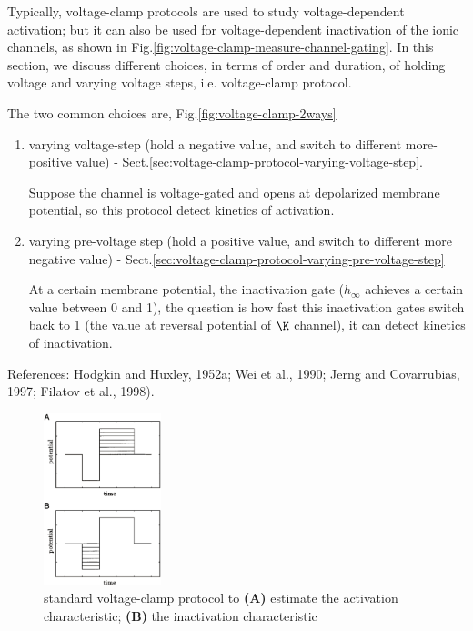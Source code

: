 Typically, voltage-clamp protocols are used to study voltage-dependent
activation; but it can also be used  for voltage-dependent inactivation of the
ionic channels, as shown in Fig.\ref{fig:voltage-clamp-measure-channel-gating}.
In this section, we discuss different choices, in terms of order and duration,
of holding voltage and varying voltage steps, i.e. voltage-clamp protocol.

The two common choices are, Fig.\ref{fig:voltage-clamp-2ways}
\begin{enumerate}
  \item varying voltage-step  (hold a negative value, and switch to different
  more-positive value) -
  Sect.\ref{sec:voltage-clamp-protocol-varying-voltage-step}.

Suppose the channel is voltage-gated and opens at depolarized membrane
potential, so this protocol  detect kinetics of activation.

  \item varying pre-voltage step (hold a positive value, and switch to
  different more negative value) - Sect.\ref{sec:voltage-clamp-protocol-varying-pre-voltage-step}

At a certain membrane potential, the inactivation gate ($h_\infty$ achieves a
certain value between 0 and 1), the question is how fast this inactivation gates
switch back to 1 (the value at reversal potential of $\K$ channel), it can
detect kinetics of inactivation.
\end{enumerate}
References: Hodgkin and Huxley, 1952a; Wei et al., 1990; Jerng and Covarrubias,
1997; Filatov et al., 1998).

\begin{figure}[htb]
    \centerline{\includegraphics[height=5cm]{./images/voltage-clamp.eps}}
    \caption{standard voltage-clamp protocol to {\bf (A)}
    estimate the activation characteristic; {\bf (B)}
    the inactivation characteristic}\label{fig:voltage-clamp}
\end{figure}



